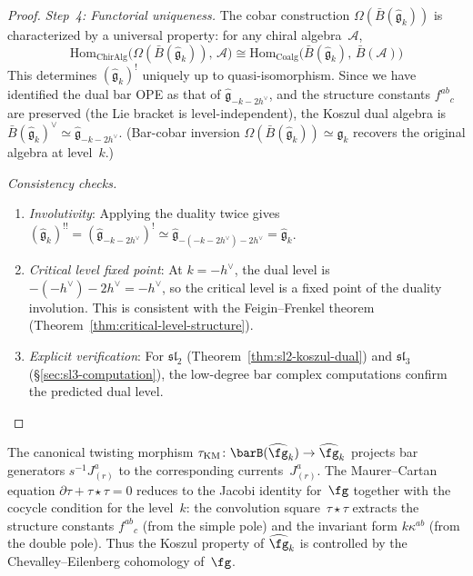\begin{proof}
\emph{Step~4: Functorial uniqueness.}
The cobar construction $\Omega(\bar{B}(\widehat{\mathfrak{g}}_k))$ is characterized by a universal property: for any chiral algebra~$\mathcal{A}$,
\begin{equation}
\mathrm{Hom}_{\text{ChirAlg}}\bigl(\Omega(\bar{B}(\widehat{\mathfrak{g}}_k)),\, \mathcal{A}\bigr) \cong \mathrm{Hom}_{\text{Coalg}}\bigl(\bar{B}(\widehat{\mathfrak{g}}_k),\, \bar{B}(\mathcal{A})\bigr)
\end{equation}
This determines $(\widehat{\mathfrak{g}}_k)^!$ uniquely up to quasi-isomorphism.  Since we have identified the dual bar OPE as that of $\widehat{\mathfrak{g}}_{-k-2h^\vee}$, and the structure constants $f^{ab}{}_c$ are preserved (the Lie bracket is level-independent), the Koszul dual algebra is $\bar{B}(\widehat{\mathfrak{g}}_k)^\vee \simeq \widehat{\mathfrak{g}}_{-k-2h^\vee}$.  (Bar-cobar inversion $\Omega(\bar{B}(\widehat{\mathfrak{g}}_k)) \simeq \widehat{\mathfrak{g}}_k$ recovers the original algebra at level~$k$.)

\emph{Consistency checks.}
\begin{enumerate}
\item \emph{Involutivity}: Applying the duality twice gives $(\widehat{\mathfrak{g}}_k)^{!!} = (\widehat{\mathfrak{g}}_{-k-2h^\vee})^! \simeq \widehat{\mathfrak{g}}_{-(-k-2h^\vee)-2h^\vee} = \widehat{\mathfrak{g}}_k$. \checkmark
\item \emph{Critical level fixed point}: At $k = -h^\vee$, the dual level is $-(-h^\vee) - 2h^\vee = -h^\vee$, so the critical level is a fixed point of the duality involution.  This is consistent with the Feigin--Frenkel theorem (Theorem~\ref{thm:critical-level-structure}). \checkmark
\item \emph{Explicit verification}: For $\mathfrak{sl}_2$ (Theorem~\ref{thm:sl2-koszul-dual}) and $\mathfrak{sl}_3$ (\S\ref{sec:sl3-computation}), the low-degree bar complex computations confirm the predicted dual level. \checkmark
\end{enumerate}
\end{proof}

\begin{remark}
\label{rem:km-twisting-morphism}
The canonical twisting morphism
$\tau_{\mathrm{KM}} \colon \barB(\widehat{\fg}_k) \to \widehat{\fg}_k$
projects bar generators $s^{-1}J^a_{(r)}$ to the corresponding
currents~$J^a_{(r)}$.  The Maurer--Cartan equation
$\partial\tau + \tau \star \tau = 0$ reduces to the Jacobi identity
for~$\fg$ together with the cocycle condition for the level~$k$:
the convolution square~$\tau \star \tau$ extracts the structure
constants $f^{ab}{}_c$ (from the simple pole) and the invariant
form $k\kappa^{ab}$ (from the double pole).  Thus the Koszul
property of $\widehat{\fg}_k$ is controlled by the Chevalley--Eilenberg
cohomology of~$\fg$.
\end{remark}

